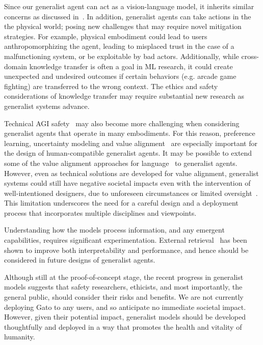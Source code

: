 \documentclass[10pt]{article} \usepackage[accepted]{tmlr}
\newcommand{\model}{{Gato}}
\begin{document}
Since our generalist agent can act as a vision-language model, it inherits similar concerns as discussed in~\citep{weidinger2021ethical,bommasani2021opportunities,rae2021scaling,Alayrac2022FlamingoAV}.
In addition, generalist agents can take actions in the the physical world; posing new challenges that may require novel mitigation strategies.
For example, physical embodiment could lead to users anthropomorphizing the agent, leading to misplaced trust in the case of a malfunctioning system, or be exploitable by bad actors.
Additionally, while cross-domain knowledge transfer is often a goal in ML research, it could create unexpected and undesired outcomes if certain behaviors (e.g. arcade game fighting) are transferred to the wrong context.
The ethics and safety considerations of knowledge transfer may require substantial new research as generalist systems advance.

Technical AGI safety~\citep{bostrom2017superintelligence} may also become more challenging when considering generalist agents that operate in many embodiments. 
For this reason, preference learning, uncertainty modeling and value alignment~\citep{russell2019human} are especially important for the design of human-compatible generalist agents. 
It may be possible to extend some of the value alignment approaches for language~\citep{ouyang2022training, kenton2021alignment} to generalist agents.
However, even as technical solutions are developed for value alignment, generalist systems could still have negative societal impacts even with the intervention of well-intentioned designers, due to unforeseen circumstances or limited oversight~\citep{amodei2016concrete}. 
This limitation underscores the need for a careful design and a deployment process that incorporates multiple disciplines and viewpoints.

Understanding how the models process information, and any emergent capabilities, requires significant experimentation. 
External retrieval~\citep{borgeaud2021improving,menick2022teaching,nakano2021webgpt,thoppilan2022lamda} has been shown to improve both interpretability and performance, and hence should be considered in future designs of generalist agents.


Although still at the proof-of-concept stage, the recent progress in generalist models suggests that safety researchers, ethicists, and most importantly, the general public, should consider their risks and benefits.
We are not currently deploying \model{} to any users, and so anticipate no immediate societal impact.
However, given their potential impact, generalist models should be developed thoughtfully and deployed in a way that promotes the health and vitality of humanity. 
\end{document}
